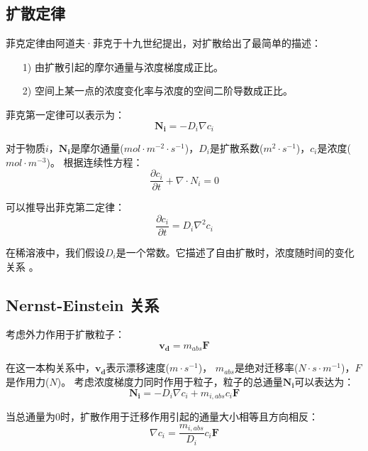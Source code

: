 \subsection{扩散定律}
菲克定律由阿道夫·菲克于十九世纪提出，对扩散给出了最简单的描述：
\begin{itemize}[leftmargin=40pt]
    \item [1)]由扩散引起的摩尔通量与浓度梯度成正比。
    \item [2)]空间上某一点的浓度变化率与浓度的空间二阶导数成正比。
\end{itemize}

菲克第一定律可以表示为：
\begin{equation}
    \mathbf{N_i}=-D_i\nabla{c_i}
\end{equation}

对于物质$i$，$\mathbf{N_i}$是摩尔通量($mol\cdot{m^{-2}\cdot{s^{-1}}}$)，$D_i$是扩散系数($m^2\cdot{s^{-1}}$)，$c_i$是浓度($mol\cdot{m^{-3}}$)。
根据连续性方程：
\begin{equation}
    \frac{\partial c_i}{\partial t}+\nabla\cdot{N_i}=0
    \label{eqation:continuity}
\end{equation}

可以推导出菲克第二定律：
\begin{equation}
    \frac{\partial c_i}{\partial t}=D_i\nabla^2{c_i}
    \label{fick's 2nd}
\end{equation}

在稀溶液中，我们假设$D_i$是一个常数。它描述了自由扩散时，浓度随时间的变化关系\cite{Sakaguchi2018} 。
\subsection{Nernst-Einstein 关系}
考虑外力作用于扩散粒子：
\begin{equation}
    \mathbf{v_d}=m_{abs}\mathbf{F}
\end{equation}

在这一本构关系中，$\mathbf{v_d}$表示漂移速度($m\cdot{s^{-1}}$)，
$m_{abs}$是绝对迁移率($N\cdot{s\cdot{m^{-1}}}$)，$F$是作用力($N$)。
考虑浓度梯度力同时作用于粒子，粒子的总通量$\mathbf{N_i}$可以表达为：
\begin{equation}
    \mathbf{N_i}=-D_i\nabla{c_i}+m_{i,abs}c_i\mathbf{F}
\end{equation}

当总通量为$0$时，扩散作用于迁移作用引起的通量大小相等且方向相反：
\begin{equation}
    \nabla{c_i}=\frac{m_{i,abs}}{D_i}c_i\mathbf{F}
\end{equation}

